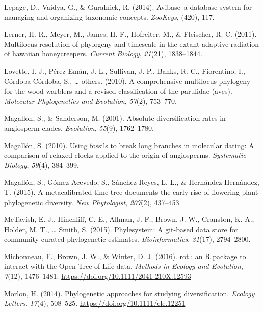 \documentclass[english,man]{apa6}
\begin{document}
\leavevmode\hypertarget{ref-lepage2014avibase}{}%
Lepage, D., Vaidya, G., \& Guralnick, R. (2014). Avibase--a database system for managing and organizing taxonomic concepts. \emph{ZooKeys}, (420), 117.

\leavevmode\hypertarget{ref-lerner2011multilocus}{}%
Lerner, H. R., Meyer, M., James, H. F., Hofreiter, M., \& Fleischer, R. C. (2011). Multilocus resolution of phylogeny and timescale in the extant adaptive radiation of hawaiian honeycreepers. \emph{Current Biology}, \emph{21}(21), 1838--1844.

\leavevmode\hypertarget{ref-lovette2010comprehensive}{}%
Lovette, I. J., Pérez-Emán, J. L., Sullivan, J. P., Banks, R. C., Fiorentino, I., Córdoba-Córdoba, S., \ldots{} others. (2010). A comprehensive multilocus phylogeny for the wood-warblers and a revised classification of the parulidae (aves). \emph{Molecular Phylogenetics and Evolution}, \emph{57}(2), 753--770.

\leavevmode\hypertarget{ref-magallon2001absolute}{}%
Magallon, S., \& Sanderson, M. (2001). Absolute diversification rates in angiosperm clades. \emph{Evolution}, \emph{55}(9), 1762--1780.

\leavevmode\hypertarget{ref-magallon2010using}{}%
Magallón, S. (2010). Using fossils to break long branches in molecular dating: A comparison of relaxed clocks applied to the origin of angiosperms. \emph{Systematic Biology}, \emph{59}(4), 384--399.

\leavevmode\hypertarget{ref-magallon2015metacalibrated}{}%
Magallón, S., Gómez-Acevedo, S., Sánchez-Reyes, L. L., \& Hernández-Hernández, T. (2015). A metacalibrated time-tree documents the early rise of flowering plant phylogenetic diversity. \emph{New Phytologist}, \emph{207}(2), 437--453.

\leavevmode\hypertarget{ref-mctavish2015phylesystem}{}%
McTavish, E. J., Hinchliff, C. E., Allman, J. F., Brown, J. W., Cranston, K. A., Holder, M. T., \ldots{} Smith, S. (2015). Phylesystem: A git-based data store for community-curated phylogenetic estimates. \emph{Bioinformatics}, \emph{31}(17), 2794--2800.

\leavevmode\hypertarget{ref-Michonneau2016}{}%
Michonneau, F., Brown, J. W., \& Winter, D. J. (2016). rotl: an R package to interact with the Open Tree of Life data. \emph{Methods in Ecology and Evolution}, \emph{7}(12), 1476--1481. \url{https://doi.org/10.1111/2041-210X.12593}

\leavevmode\hypertarget{ref-Morlon2014}{}%
Morlon, H. (2014). Phylogenetic approaches for studying diversification. \emph{Ecology Letters}, \emph{17}(4), 508--525. \url{https://doi.org/10.1111/ele.12251}
\end{document}
